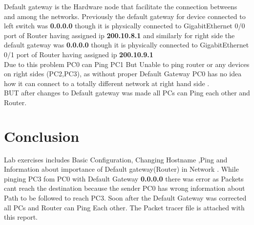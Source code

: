 \documentclass[a4paper,12pt]{article}
\begin{document}
Default gateway is the Hardware node that facilitate the connection betweens and among the networks. Previously  the default gateway for device connected to left switch was \textbf{0.0.0.0} though it is physically connected to GigabitEthernet 0/0 port of Router having assigned ip \textbf{200.10.8.1} and similarly for right side the default gateway was \textbf{0.0.0.0} though it is physically connected to GigabitEthernet 0/1 port of Router having assigned ip \textbf{200.10.9.1}\\

Due to this  problem PC0 can Ping PC1 But Unable to ping router or any devices on right sides (PC2,PC3), as without proper Default Gateway PC0 has  no idea how it can connect to a totally different network at right hand side .\\

BUT after changes to Default gateway was made  all PCs can Ping each other and  Router.


\section{Conclusion}
Lab exercises includes Basic Configuration, Changing Hostname ,Ping and Information about importance of Default gateway(Router) in Network . While pinging PC3 fom PC0 with Default Gateway \textbf{0.0.0.0} there was error as Packets cant reach the destination because the sender PC0 has wrong information about Path to be followed to reach PC3. Soon after the Default Gateway was corrected all PCs and Router can Ping Each other. The Packet tracer file is attached with this report.
\end{document}
